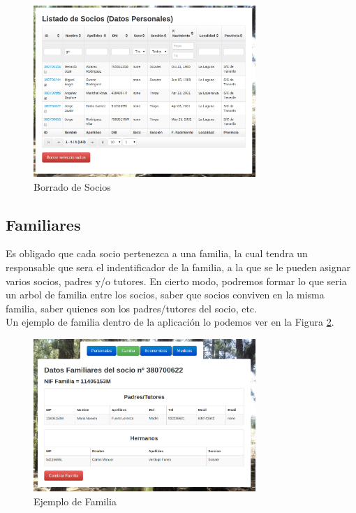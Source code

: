 \begin{figure}[H]
\begin{center}
\includegraphics[width=0.75\textwidth]{images/borrado_socios.jpg}
\caption{Borrado de Socios}
\label{fig:borrar_socio}
\end{center}
\end{figure}

\subsection{Familiares}

Es obligado que cada socio pertenezca a una familia, la cual tendra un responsable que sera el indentificador de la familia, a la que se le pueden asignar varios socios, padres y/o tutores. En cierto modo, podremos
formar lo que seria un arbol de familia entre los socios, saber que socios conviven en la misma familia, saber quienes son los padres/tutores del socio, etc.\\

Un ejemplo de familia dentro de la aplicación lo podemos ver en la Figura \ref{fig:familia}.\\

\begin{figure}[H]
\begin{center}
\includegraphics[width=0.75\textwidth]{images/familia_socio.jpg}
\caption{Ejemplo de Familia}
\label{fig:familia}
\end{center}
\end{figure}

